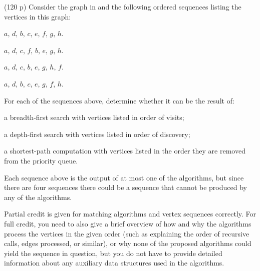 \documentclass{jn-pset}
\begin{document}
\begin{problem}%
  \label{problem:graph-algorithm-outputs}%
  (120 p)
  Consider the graph in   
  and the following ordered sequences listing the vertices in this graph:
  \begin{compactenum}
  \item%
    \label{sequence-bfs}%
    $a$, $d$, $b$, $c$, $e$, $f$, $g$, $h$.
    
  \item%
    \label{sequence-dijkstra}%
    $a$, $d$, $c$, $f$, $b$, $e$, $g$, $h$.
        
  \item%
    \label{sequence-spoiler}%
    $a$, $d$, $c$, $b$, $e$, $g$, $h$, $f$.
        
  \item%
    \label{sequence-dfs}%
    $a$, $d$, $b$, $c$, $e$, $g$, $f$, $h$.

  \end{compactenum}
  For each of the sequences above, determine whether it can be the result of:
  \begin{compactenum}[(a)]
  \item
    a breadth-first search with vertices listed in order of visits;
    
  \item
    a depth-first search with vertices listed in order of discovery;
    
  \item
    a shortest-path computation with vertices listed in the order they
    are removed from the priority queue.

  \end{compactenum}
%
  Each sequence above is the output of at most one of the algorithms,
  but since there are four sequences there could be a sequence that
  cannot be produced by any of the algorithms.

      

  Partial credit is given for matching algorithms and vertex sequences correctly.
%
  For full credit, you need to
  also
  give a
  brief
  overview of how and why the
  algorithms process the vertices in the given order
  (such as explaining the order of recursive calls, edges processed,
  or similar),
  or why none of the proposed algorithms could yield the sequence in
  question,  
  but you do not have to provide detailed information about any
  auxiliary data structures used in the algorithms.


\end{problem}
\end{document}
